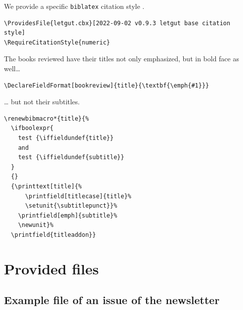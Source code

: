 \documentclass{letgut}
\begin{document}
We provide a specific \lstinline+biblatex+ citation style .

\begin{lstlisting}
\ProvidesFile{letgut.cbx}[2022-09-02 v0.9.3 letgut base citation style]
\RequireCitationStyle{numeric}
\end{lstlisting}

The books reviewed have their titles not only emphasized, but in bold face as
well\ldots{}

\begin{lstlisting}
\DeclareFieldFormat[bookreview]{title}{\textbf{\emph{#1}}}
\end{lstlisting}

\ldots{} but not their subtitles.

\begin{lstlisting}
\renewbibmacro*{title}{%
  \ifboolexpr{
    test {\iffieldundef{title}}
    and
    test {\iffieldundef{subtitle}}
  }
  {}
  {\printtext[title]{%
      \printfield[titlecase]{title}%
      \setunit{\subtitlepunct}}%
    \printfield[emph]{subtitle}%
    \newunit}%
  \printfield{titleaddon}}
\end{lstlisting}

\section{Provided files}
\label{sec:org8352527}

\subsection{Example file of an issue of the newsletter}
\label{sec:orgcce26ed}
\end{document}
